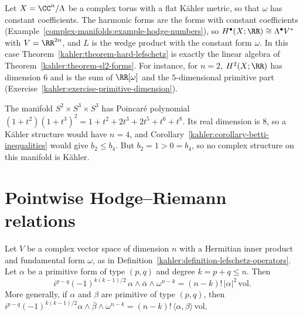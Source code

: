\begin{example}\label{kahler:example-tori}
Let $X = \CC^n/\Lambda$ be a complex torus with a flat K\"ahler metric, so that $\omega$ has constant coefficients. The harmonic forms are the
forms with constant coefficients (Example~\ref{complex-manifolds:example-hodge-numbers}), so $H^\bullet(X; \RR) \cong \Lambda^\bullet V^*$ with
$V = \RR^{2n}$, and $L$ is the wedge product with the constant form $\omega$. In this case
Theorem~\ref{kahler:theorem-hard-lefschetz} is exactly the linear algebra of Theorem~\ref{kahler:theorem-sl2-forms}. For
instance, for $n = 2$, $H^2(X; \RR)$ has dimension $6$ and is the sum of $\RR[\omega]$ and the $5$-dimensional primitive part
(Exercise~\ref{kahler:exercise-primitive-dimension}).
\end{example}

\begin{example}\label{kahler:example-betti-obstruction}
The manifold $S^2 \times S^3 \times S^3$ has Poincar\'e polynomial $(1 + t^2)(1 + t^3)^2 = 1 + t^2 + 2t^3 + 2t^5 + t^6 + t^8$. Its real
dimension is $8$, so a K\"ahler structure would have $n = 4$, and Corollary~\ref{kahler:corollary-betti-inequalities} would
give $b_2 \leq b_4$. But $b_2 = 1 > 0 = b_4$, so no complex structure on this manifold is K\"ahler.
\end{example}

\section{Pointwise Hodge--Riemann relations}\label{kahler:section-pointwise}

\begin{proposition}\label{kahler:proposition-pointwise-hodge-riemann}
Let $V$ be a complex vector space of dimension $n$ with a Hermitian inner product and fundamental form $\omega$, as in
Definition~\ref{kahler:definition-lefschetz-operators}. Let $\alpha$ be a primitive form of type $(p,q)$ and degree $k = p + q \leq n$. Then
\[
i^{p-q}(-1)^{k(k-1)/2}\,\alpha \wedge \bar\alpha \wedge \omega^{n-k} = (n-k)!\,|\alpha|^2\,\mathrm{vol} .
\]
More generally, if $\alpha$ and $\beta$ are primitive of type $(p,q)$, then
$i^{p-q}(-1)^{k(k-1)/2}\alpha \wedge \bar\beta \wedge \omega^{n-k} = (n-k)!\,\langle\alpha, \beta\rangle\,\mathrm{vol}$.
\end{proposition}

